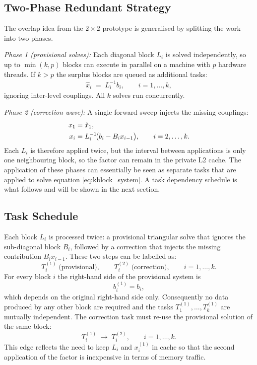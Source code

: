 \subsection{Two-Phase Redundant Strategy}
The overlap idea from the $2\times2$ prototype is generalised by splitting the work into two phases.

\textit{Phase 1 (provisional solves):}  
Each diagonal block $L_i$ is solved independently, so up to
$\min(k, p)$ blocks can execute in parallel on a machine with $p$ hardware threads. If $k>p$ the surplus blocks are queued as additional tasks:
\begin{align}
  \hat{x}_{i} \;=\; L_{i}^{-1} b_{i},
  \qquad i = 1,\dots,k,
\end{align}
ignoring inter-level couplings.  All $k$ solves run concurrently.

\textit{Phase 2 (correction wave):}  
A single forward sweep injects the missing couplings:
\begin{align}
  x_{1} &= \hat{x}_{1}, \notag\\
  x_{i} &= L_{i}^{-1}\!\bigl(b_{i}-B_{i}x_{i-1}\bigr),
  \qquad i = 2,\dots,k.
  \label{eq:kblock_correct}
\end{align}
Each $L_{i}$ is therefore applied twice, but the interval between
applications is only one neighbouring block, so the factor can remain in the private L2 cache.
The application of these phases can essentially be seen as separate tasks that are applied to solve equation \ref{eq:kblock_system}. A task dependency schedule is what follows and will be shown in the next section.


\subsection{Task Schedule}
\label{chap:meth_task_sched}
Each block $L_i$ is processed twice:  
a provisional triangular solve that ignores the sub-diagonal block
$B_{i}$, followed by a correction that injects the missing
contribution $B_{i}x_{i-1}$.
These two steps can be labelled as:
$$
  T^{(1)}_{i}\; \text{(provisional)}, \qquad
  T^{(2)}_{i}\; \text{(correction)}, \qquad i=1,\dots,k .
$$
For every block $i$ the right-hand side of the provisional system is
$$  b^{(1)}_{i}=b_{i}, $$
which depends on the original right-hand side only.
Consequently no data produced by any other block are required and the
tasks $T^{(1)}_{1},\dots, T^{(1)}_{k}$
are mutually independent.
The correction task must re-use the provisional solution of the same
block:
$$
  T^{(1)}_{i}
    \;\longrightarrow\;
  T^{(2)}_{i},
  \qquad
  i=1,\dots,k .
$$
This edge reflects the need to keep $L_i$ and $x^{(1)}_i$ in cache so
that the second application of the factor is inexpensive in terms of
memory traffic.

